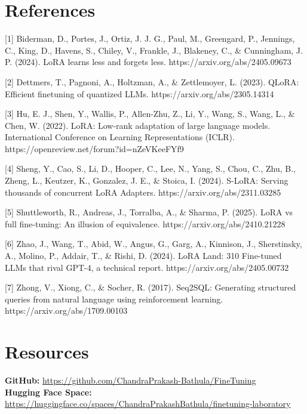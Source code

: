 \documentclass{article}
\begin{document}
\section*{References}
{
\small
 
[1] Biderman, D., Portes, J., Ortiz, J. J. G., Paul, M., Greengard, P., Jennings, C., King, D., Havens, S., Chiley, V., Frankle, J., Blakeney, C., \& Cunningham, J. P. (2024). LoRA learns less and forgets less. https://arxiv.org/abs/2405.09673
 
[2] Dettmers, T., Pagnoni, A., Holtzman, A., \& Zettlemoyer, L. (2023). QLoRA: Efficient finetuning of quantized LLMs. https://arxiv.org/abs/2305.14314
 
[3] Hu, E. J., Shen, Y., Wallis, P., Allen-Zhu, Z., Li, Y., Wang, S., Wang, L., \& Chen, W. (2022). LoRA: Low-rank adaptation of large language models. International Conference on Learning Representations (ICLR). https://openreview.net/forum?id=nZeVKeeFYf9
 
[4] Sheng, Y., Cao, S., Li, D., Hooper, C., Lee, N., Yang, S., Chou, C., Zhu, B., Zheng, L., Keutzer, K., Gonzalez, J. E., \& Stoica, I. (2024). S-LoRA: Serving thousands of concurrent LoRA Adapters. https://arxiv.org/abs/2311.03285
 
[5] Shuttleworth, R., Andreas, J., Torralba, A., \& Sharma, P. (2025). LoRA vs full fine-tuning: An illusion of equivalence. https://arxiv.org/abs/2410.21228

[6] Zhao, J., Wang, T., Abid, W., Angus, G., Garg, A., Kinnison, J., Sherstinsky, A., Molino, P., Addair, T., \& Rishi, D. (2024). LoRA Land: 310 Fine-tuned LLMs that rival GPT-4, a technical report. https://arxiv.org/abs/2405.00732

[7] Zhong, V., Xiong, C., \& Socher, R. (2017). Seq2SQL: Generating structured queries from natural language using reinforcement learning. https://arxiv.org/abs/1709.00103
}
\section{Resources}
\textbf{GitHub:} \url{https://github.com/ChandraPrakash-Bathula/FineTuning}\\
\textbf{Hugging Face Space:} \url{https://huggingface.co/spaces/ChandraPrakashBathula/finetuning-laboratory}
\end{document}
